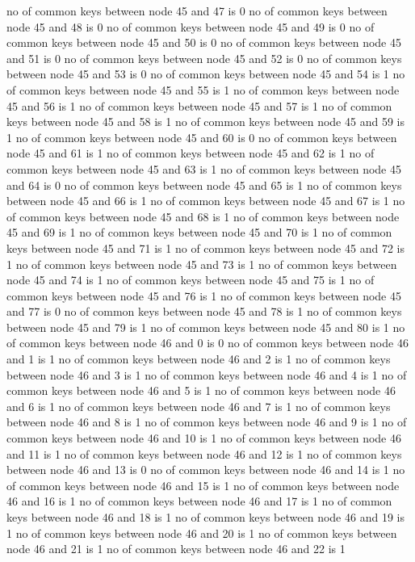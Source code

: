 no of common keys between node 45 and 47 is 0
no of common keys between node 45 and 48 is 0
no of common keys between node 45 and 49 is 0
no of common keys between node 45 and 50 is 0
no of common keys between node 45 and 51 is 0
no of common keys between node 45 and 52 is 0
no of common keys between node 45 and 53 is 0
no of common keys between node 45 and 54 is 1
no of common keys between node 45 and 55 is 1
no of common keys between node 45 and 56 is 1
no of common keys between node 45 and 57 is 1
no of common keys between node 45 and 58 is 1
no of common keys between node 45 and 59 is 1
no of common keys between node 45 and 60 is 0
no of common keys between node 45 and 61 is 1
no of common keys between node 45 and 62 is 1
no of common keys between node 45 and 63 is 1
no of common keys between node 45 and 64 is 0
no of common keys between node 45 and 65 is 1
no of common keys between node 45 and 66 is 1
no of common keys between node 45 and 67 is 1
no of common keys between node 45 and 68 is 1
no of common keys between node 45 and 69 is 1
no of common keys between node 45 and 70 is 1
no of common keys between node 45 and 71 is 1
no of common keys between node 45 and 72 is 1
no of common keys between node 45 and 73 is 1
no of common keys between node 45 and 74 is 1
no of common keys between node 45 and 75 is 1
no of common keys between node 45 and 76 is 1
no of common keys between node 45 and 77 is 0
no of common keys between node 45 and 78 is 1
no of common keys between node 45 and 79 is 1
no of common keys between node 45 and 80 is 1
no of common keys between node 46 and 0 is 0
no of common keys between node 46 and 1 is 1
no of common keys between node 46 and 2 is 1
no of common keys between node 46 and 3 is 1
no of common keys between node 46 and 4 is 1
no of common keys between node 46 and 5 is 1
no of common keys between node 46 and 6 is 1
no of common keys between node 46 and 7 is 1
no of common keys between node 46 and 8 is 1
no of common keys between node 46 and 9 is 1
no of common keys between node 46 and 10 is 1
no of common keys between node 46 and 11 is 1
no of common keys between node 46 and 12 is 1
no of common keys between node 46 and 13 is 0
no of common keys between node 46 and 14 is 1
no of common keys between node 46 and 15 is 1
no of common keys between node 46 and 16 is 1
no of common keys between node 46 and 17 is 1
no of common keys between node 46 and 18 is 1
no of common keys between node 46 and 19 is 1
no of common keys between node 46 and 20 is 1
no of common keys between node 46 and 21 is 1
no of common keys between node 46 and 22 is 1
